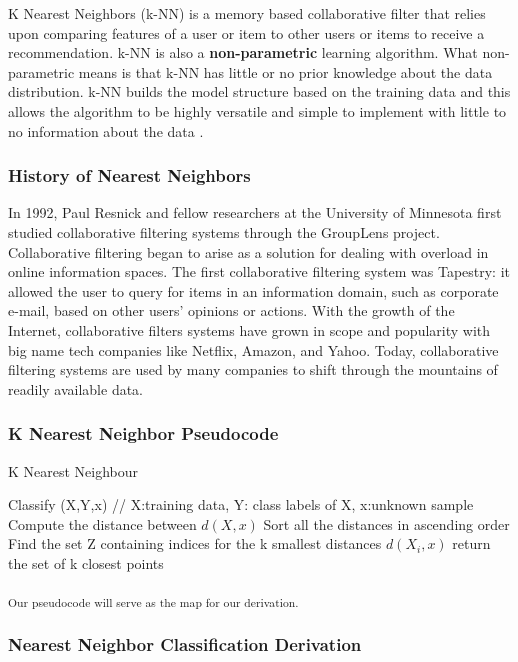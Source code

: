 \documentclass{report}
\begin{document}
K Nearest Neighbors (k-NN) is a memory based collaborative filter that relies upon comparing features of a user or item to other users or items to receive a recommendation. 
k-NN is also a \textbf{non-parametric} learning algorithm. What non-parametric means is that k-NN has little or no prior knowledge about the data distribution. k-NN  builds the model structure based on the training data and this allows the algorithm to be highly versatile and simple to implement with little to no information about the data \cite{3}. 

\subsubsection*{History of Nearest Neighbors}

In 1992, Paul Resnick and fellow researchers at the University of Minnesota first studied collaborative filtering systems through the GroupLens project\cite{2}\cite{8}.  Collaborative filtering began to arise as a solution for dealing with overload in online information spaces. The first collaborative filtering system was Tapestry: it allowed the user to query for
items in an information domain, such as corporate e-mail, based on
other users’ opinions or actions\cite{6}. With the growth of the Internet, collaborative filters systems have grown in scope and popularity with big name tech companies like Netflix, Amazon, and Yahoo. Today, collaborative filtering systems are used by many companies to shift through the mountains of readily available data.

\subsubsection{K Nearest Neighbor Pseudocode }
\begin{algorithm}
  \caption{K Nearest Neighbour}
  \begin{algorithmic}
  	\State Classify (X,Y,x) // X:training data, Y: class labels of X, x:unknown sample
	\State Compute the distance between $d(X, x)$
	\State Sort all the distances in ascending order
	\EndFor
	\State Find the set Z containing indices for the k smallest distances $d(X_{i},x)$
	\State return the set of k closest points 
  \end{algorithmic}
\end{algorithm}
\textsubscript{Our pseudocode will serve as the map for our derivation.}


\subsubsection{Nearest Neighbor Classification Derivation}
\end{document}
